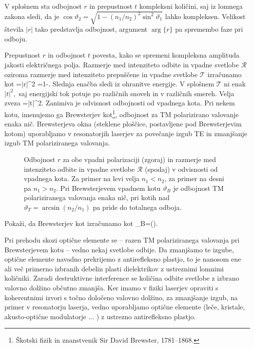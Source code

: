 V splošnem sta odbojnost $r$ in prepustnost $t$ kompleksni
količini, saj iz lomnega zakona sledi, da je $\cos\vartheta_{2}=
\sqrt{1-\left(n_{1}/n_{2}\right)^{2}\sin^{2}\vartheta_{1}}$
lahko kompleksen. Velikost števila $\left|r\right|$ tako predstavlja
odbojnost, argument $\arg\{r\}$ pa spremembo faze
pri odboju.

Prepustnost $r$ in odbojnost $t$ povesta, kako se spremeni kompleksna
amplituda jakosti električnega polja. Razmerje med intenziteto odbite
in vpadne svetlobe $\mathcal{R}$ oziroma razmerje med intenziteto prepuščene in vpadne svetlobe
$\mathcal{T}$ izračunamo kot 
\beq
{}=\left|r\right|^{2} \qquad {} \qquad {}=1-.
\eeq
Slednja enačba sledi iz ohranitve energije. V splošnem $\mathcal{T}$
ni enak $\left|t\right|^{2},$ saj energijski tok potuje po različnih
snoveh in v različnih smereh. Velja zveza
\beq
{}=\left|t\right|^{2}.
\eeq
Zanimiva je odvisnost odbojnosti od vpadnega kota. Pri nekem kotu, 
imenujemo ga Brewsterjev kot\footnote{Škotski fizik in znanstvenik Sir David Brewster, 1781--1868.}, 
odbojnost za TM polarizirano valovanje enaka nič. Brewsterjeva
okna (steklene ploščice, postavljene pod Brewsterjevim kotom) uporabljamo
v resonatorjih laserjev za povečanje izgub TE in zmanjšanje izgub
TM polariziranega valovanja.
\begin{figure}[h]
\centering
  \def\svgwidth{140truemm} 
  
\caption{Odbojnost $r$ za obe vpadni polarizaciji (zgoraj) in razmerje med intenziteto odbite
in vpadne svetlobe $\mathcal{R}$ (spodaj) v odvisnosti od vpadnega kota. Za primer na levi velja
$n_1<n_2$, za primer na desni pa $n_1>n_2$. Pri Brewsterjevem vpadnem 
kotu $\vartheta_B$ je odbojnost TM polariziranega valovanja enaka nič, pri kotih nad 
$\vartheta_T = \arcsin(n_2/n_1)$ pa pride do totalnega odboja.}
\label{fig:Brewster}
\end{figure}

\begin{definition}
Pokaži, da Brewsterjev kot izračunamo kot 
\beq
\vartheta_{B}=\arctan\left(\right).
\eeq
\end{definition}

\begin{remark}
Pri prehodu skozi optične elemente se --
razen TM polariziranega valovanja pri Brewsterjevem 
kotu -- vedno nekaj
svetlobe odbije. Da zmanjšamo te izgube, optične elemente navadno
prekrijemo z antirefleksno plastjo, to je nanosom ene ali več primerno
izbranih debelin plasti dielektrikov z ustreznimi lomnimi količniki.
Zaradi destruktivne interference se količina odbite svetlobe z izbrano
valovno dolžino občutno zmanjša. Ker imamo v fiziki laserjev opraviti
s koherentnimi izvori s točno določeno valovno dolžino, za zmanjšanje
izgub, na primer v resonatorju laserja, vedno uporabljamo optične
elemente (leče, kristale, akusto-optične modulatorje ... ) z ustrezno
antirefleksno plastjo.
\end{remark}

